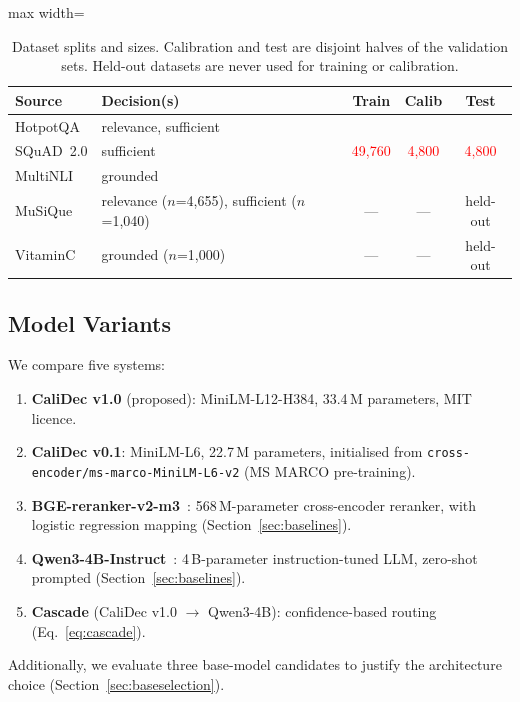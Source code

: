 \documentclass[twocolumn]{ICCKjournal}
\newcommand{\ph}[1]{\textcolor{red}{#1}}
\begin{document}
\begin{table}[H]
\caption{Dataset splits and sizes. Calibration and test are disjoint halves of the validation sets. Held-out datasets are never used for training or calibration.}
\label{tab:datasplit}
\centering
\small
\begin{adjustbox}{max width=\linewidth}
\begin{tabular}{llccc}
\toprule
\textbf{Source} & \textbf{Decision(s)} & \textbf{Train} & \textbf{Calib} & \textbf{Test} \\
\midrule
HotpotQA    & relevance, sufficient & \multirow{3}{*}{\ph{49,760}} & \multirow{3}{*}{\ph{4,800}} & \multirow{3}{*}{\ph{4,800}} \\
SQuAD~2.0   & sufficient            & & & \\
MultiNLI    & grounded              & & & \\
\midrule
MuSiQue     & relevance ($n$=4,655), sufficient ($n$=1,040) & --- & --- & held-out \\
VitaminC    & grounded ($n$=1,000) & --- & --- & held-out \\
\bottomrule
\end{tabular}
\end{adjustbox}
\end{table}

\subsection{Model Variants}
We compare five systems:
\begin{enumerate}[leftmargin=*]
    \item \textbf{CaliDec v1.0} (proposed): MiniLM-L12-H384, 33.4\,M parameters, MIT licence.
    \item \textbf{CaliDec v0.1}: MiniLM-L6, 22.7\,M parameters, initialised from \texttt{cross-encoder/ms-marco-MiniLM-L6-v2} (MS MARCO pre-training).
    \item \textbf{BGE-reranker-v2-m3}~\cite{bge_m3}: 568\,M-parameter cross-encoder reranker, with logistic regression mapping (Section~\ref{sec:baselines}).
    \item \textbf{Qwen3-4B-Instruct}~\cite{qwen2025qwen3}: 4\,B-parameter instruction-tuned LLM, zero-shot prompted (Section~\ref{sec:baselines}).
    \item \textbf{Cascade} (CaliDec v1.0 $\to$ Qwen3-4B): confidence-based routing (Eq.~\ref{eq:cascade}).
\end{enumerate}

Additionally, we evaluate three base-model candidates to justify the architecture choice (Section~\ref{sec:baseselection}).
\end{document}

